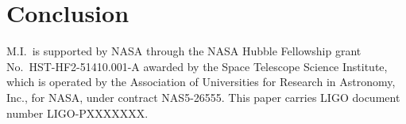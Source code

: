 \documentclass[aps,prd,twocolumn,superscriptaddress,preprintnumbers,floatfix,nofootinbib]{revtex4-2}
\newcommand{\dcc}{LIGO-PXXXXXXX}
\begin{document}
\section{Conclusion}

\begin{acknowledgments}
M.I.\ is supported by NASA through the NASA Hubble Fellowship
grant No.\ HST-HF2-51410.001-A awarded by the Space Telescope
Science Institute, which is operated by the Association of Universities
for Research in Astronomy, Inc., for NASA, under contract NAS5-26555.
This paper carries LIGO document number \dcc{}.
\end{acknowledgments}

\end{document}
